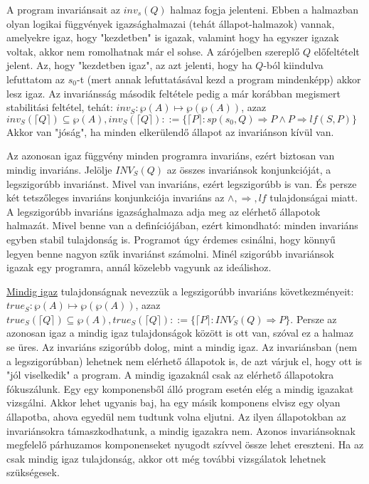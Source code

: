 \documentclass{article}
\begin{document}
A program invariánsait az $inv_s(Q)$ halmaz fogja jelenteni. Ebben a halmazban olyan logikai függvények igazsághalmazai (tehát állapot-halmazok) vannak, amelyekre igaz, hogy "kezdetben" is igazak, valamint hogy ha egyszer igazak voltak, akkor nem romolhatnak már el sohse. A zárójelben szereplő $Q$ előfeltételt jelent. Az, hogy "kezdetben igaz", az azt jelenti, hogy ha $Q$-ból kiindulva lefuttatom az $s_0$-t (mert annak lefuttatásával kezd a program mindenképp) akkor lesz igaz. Az invariánsság második feltétele pedig a már korábban megismert stabilitási feltétel, tehát: $inv_S : \wp(A) \mapsto \wp(\wp(A))$, azaz $inv_S(\lceil Q \rceil) \subseteq \wp(A), inv_S(\lceil Q \rceil) ::= \lbrace \lceil P \rceil : sp(s_0, Q) \Rightarrow P \land P \Rightarrow lf(S,P)\rbrace$ Akkor van "jóság", ha minden elkerülendő állapot az invariánson kívül van.

Az azonosan igaz függvény minden programra invariáns, ezért biztosan van mindig invariáns. Jelölje $INV_S(Q)$ az összes invariánsok konjunkcióját, a legszigorúbb invariánst. Mivel van invariáns, ezért legszigorúbb is van. És persze két tetszőleges invariáns konjunkciója invariáns az $\land, \Rightarrow, lf$ tulajdonságai miatt. A legszigorúbb invariáns igazsághalmaza adja meg az elérhető állapotok halmazát. Mivel benne van a definíciójában, ezért kimondható: minden invariáns egyben stabil tulajdonság is. Programot úgy érdemes csinálni, hogy könnyű legyen benne nagyon szűk invariánst számolni. Minél szigorúbb invariánsok igazak egy programra, annál közelebb vagyunk az ideálishoz. 

\underline{Mindig igaz} tulajdonságnak nevezzük a legszigorúbb invariáns következményeit: $true_S : \wp(A) \mapsto \wp(\wp(A))$, azaz $true_S(\lceil Q \rceil) \subseteq \wp(A), true_S(\lceil Q \rceil) ::= \lbrace \lceil P \rceil : INV_S(Q) \Rightarrow P\rbrace$. Persze az azonosan igaz a mindig igaz tulajdonságok között is ott van, szóval ez a halmaz se üres. Az invariáns szigorúbb dolog, mint a mindig igaz. Az invariánsban (nem a legszigorúbban) lehetnek nem elérhető állapotok is, de azt várjuk el, hogy ott is "jól viselkedik" a program. A mindig igazaknál csak az elérhető állapotokra fókuszálunk. Egy egy komponensből álló program esetén elég a mindig igazakat vizsgálni. Akkor lehet ugyanis baj, ha egy másik komponens elvisz egy olyan állapotba, ahova egyedül nem tudtunk volna eljutni. Az ilyen állapotokban az invariánsokra támaszkodhatunk, a mindig igazakra nem. Azonos invariánsoknak megfelelő párhuzamos komponenseket nyugodt szívvel össze lehet ereszteni. Ha az csak mindig igaz tulajdonság, akkor ott még további vizsgálatok lehetnek szükségesek.
\end{document}
